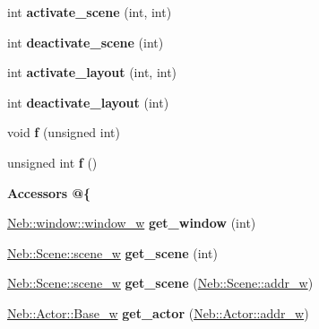 \begin{DoxyCompactItemize}
\item 
\hypertarget{classNeb_1_1app_aa558ff3c281cd6f6b7bdca7f5a7807ff}{int {\bfseries activate\-\_\-scene} (int, int)}\label{classNeb_1_1app_aa558ff3c281cd6f6b7bdca7f5a7807ff}

\item 
\hypertarget{classNeb_1_1app_a5b1a2bc9d50490f9fce6edf33a910ad5}{int {\bfseries deactivate\-\_\-scene} (int)}\label{classNeb_1_1app_a5b1a2bc9d50490f9fce6edf33a910ad5}

\item 
\hypertarget{classNeb_1_1app_a421f2d98f0857f6d73824740019c94f1}{int {\bfseries activate\-\_\-layout} (int, int)}\label{classNeb_1_1app_a421f2d98f0857f6d73824740019c94f1}

\item 
\hypertarget{classNeb_1_1app_a81e36552d5b9bd439237b8ca7950f82b}{int {\bfseries deactivate\-\_\-layout} (int)}\label{classNeb_1_1app_a81e36552d5b9bd439237b8ca7950f82b}

\item 
\hypertarget{classNeb_1_1app_a373ce82cfb06b21444d90daeaa0900a5}{void {\bfseries f} (unsigned int)}\label{classNeb_1_1app_a373ce82cfb06b21444d90daeaa0900a5}

\item 
\hypertarget{classNeb_1_1app_a4158adddede1a017c151da072503dcad}{unsigned int {\bfseries f} ()}\label{classNeb_1_1app_a4158adddede1a017c151da072503dcad}

\end{DoxyCompactItemize}
\begin{Indent}{\bf \-Accessors @\{}\par
\begin{DoxyCompactItemize}
\item 
\hypertarget{classNeb_1_1app_a9e1237d528a0bfd338526751bff4a60d}{\hyperlink{classNeb_1_1weak__ptr}{\-Neb\-::window\-::window\-\_\-w} {\bfseries get\-\_\-window} (int)}\label{classNeb_1_1app_a9e1237d528a0bfd338526751bff4a60d}

\item 
\hypertarget{classNeb_1_1app_af34dfea535edde96fc5e5dfb67c37505}{\hyperlink{classNeb_1_1weak__ptr}{\-Neb\-::\-Scene\-::scene\-\_\-w} {\bfseries get\-\_\-scene} (int)}\label{classNeb_1_1app_af34dfea535edde96fc5e5dfb67c37505}

\item 
\hypertarget{classNeb_1_1app_ae37a92e33de6acf1fd0c338300862ca8}{\hyperlink{classNeb_1_1weak__ptr}{\-Neb\-::\-Scene\-::scene\-\_\-w} {\bfseries get\-\_\-scene} (\hyperlink{classNeb_1_1weak__ptr}{\-Neb\-::\-Scene\-::addr\-\_\-w})}\label{classNeb_1_1app_ae37a92e33de6acf1fd0c338300862ca8}

\item 
\hypertarget{classNeb_1_1app_a22284f20ae70f616792bceef3fa15bfe}{\hyperlink{classNeb_1_1weak__ptr}{\-Neb\-::\-Actor\-::\-Base\-\_\-w} {\bfseries get\-\_\-actor} (\hyperlink{classNeb_1_1weak__ptr}{\-Neb\-::\-Actor\-::addr\-\_\-w})}\label{classNeb_1_1app_a22284f20ae70f616792bceef3fa15bfe}

\end{DoxyCompactItemize}
\end{Indent}
